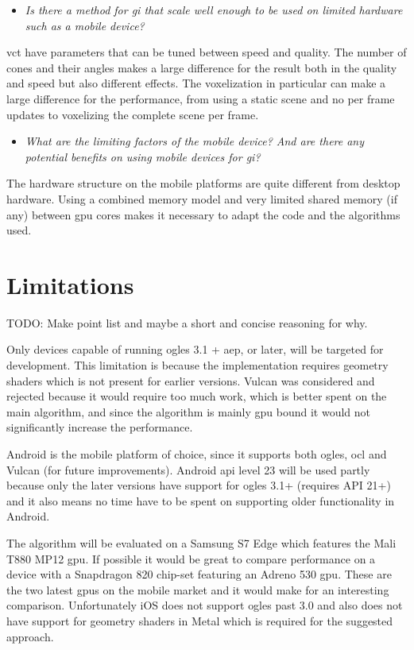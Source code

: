 \begin{itemize}
  \item \textit{Is there a method for \acrlong{gi} that scale well enough to be used on limited hardware such as a mobile device?}
\end{itemize}

\gls{vct} have parameters that can be tuned between speed and quality. 
The number of cones and their angles makes a large difference for the result both in the quality and speed but also different effects. 
The voxelization in particular can make a large difference for the performance, from using a static scene and no per frame updates to voxelizing the complete scene per frame.

\begin{itemize}
  \item \textit{What are the limiting factors of the mobile device? And are there any potential benefits on using mobile devices for \gls{gi}?}
\end{itemize}

The hardware structure on the mobile platforms are quite different from desktop hardware. 
Using a combined memory model and very limited shared memory (if any) between \gls{gpu} cores makes it necessary to adapt the code and the algorithms used.

\section{Limitations}

TODO: Make point list and maybe a short and concise reasoning for why.

Only devices capable of running \gls{ogles} 3.1 + \gls{aep}, or later, will be targeted for development. This limitation is because the implementation requires geometry shaders which is not present for earlier versions. 
Vulcan was considered and rejected because it would require too much work, which is better spent on the main algorithm, and since the algorithm is mainly \gls{gpu} bound it would not significantly increase the performance.

Android is the mobile platform of choice, since it supports both \gls{ogles}, \gls{ocl} and Vulcan (for future improvements). 
Android \acrshort{api} level 23 will be used partly because only the later versions have support for \gls{ogles} 3.1+ (requires API 21+) and it also means no time have to be spent on supporting older functionality in Android.

The algorithm will be evaluated on a Samsung S7 Edge which features the Mali T880 MP12 \gls{gpu}. 
If possible it would be great to compare performance on a device with a Snapdragon 820 chip-set featuring an Adreno 530 \gls{gpu}. These are the two latest \glspl{gpu} on the mobile market and it would make for an interesting comparison. 
Unfortunately iOS does not support \gls{ogles} past 3.0 and also does not have support for geometry shaders in Metal which is required for the suggested approach.

